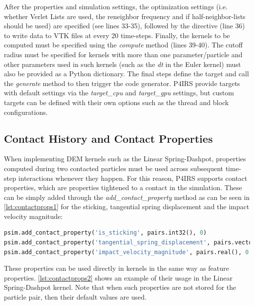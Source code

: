 \documentclass[preprint,12pt]{elsarticle}
\begin{document}
After the properties and simulation settings, the optimization settings (i.e. whether Verlet Lists are used, the reneighbor frequency and if half-neighbor-lists should be used) are specified (see lines 33-35), followed by the directive (line 36) to write data to VTK files at every 20 time-steps.
Finally, the kernels to be computed must be specified using the \emph{compute} method (lines 39-40).
The cutoff radius must be specified for kernels with more than one parameter/particle and other parameters used in such kernels (such as the \emph{dt} in the Euler kernel) must also be provided as a Python dictionary.
The final steps define the target and call the \emph{generate} method to then trigger the code generator.
P4IRS provide targets with default settings via the \emph{target\_cpu} and \emph{target\_gpu} settings, but custom targets can be defined with their own options such as the thread and block configurations.


\subsection{Contact History and Contact Properties}
\label{sec:contact_history}

When implementing DEM kernels such as the Linear Spring-Dashpot, properties computed during two contacted particles must be used across subsequent time-step interactions whenever they happen.
For this reason, P4IRS supports contact properties, which are properties tightened to a contact in the simulation.
These can be simply added through the \emph{add\_contact\_property} method as can be seen in \autoref{lst:contactprops1} for the sticking, tangential spring displacement and the impact velocity magnitude:

\begin{lstlisting}[language=Python,
		   label={lst:contactprops1},
		   caption={Setup example for contact properties.}]
psim.add_contact_property('is_sticking', pairs.int32(), 0)
psim.add_contact_property('tangential_spring_displacement', pairs.vector(), [0.0, 0.0, 0.0])
psim.add_contact_property('impact_velocity_magnitude', pairs.real(), 0.0)
\end{lstlisting}

These properties can be used directly in kernels in the same way as feature properties.
\autoref{lst:contactprops2} shows an example of their usage in the Linear Spring-Dashpot kernel.
Note that when such properties are not stored for the particle pair, then their default values are used.
\end{document}
